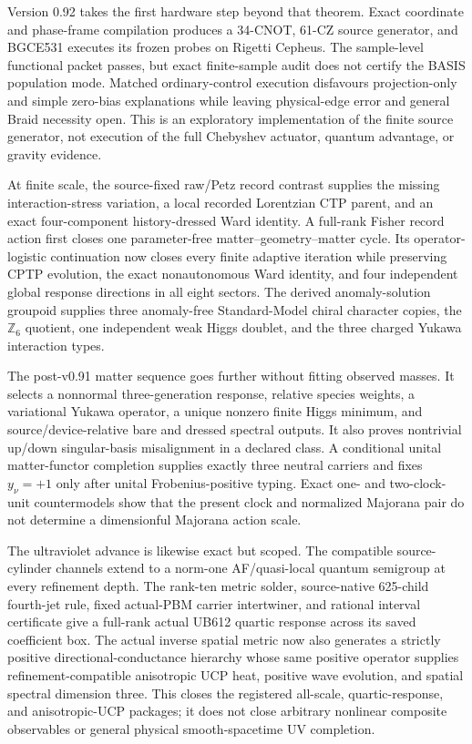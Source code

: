 \documentclass[11pt]{article}
\theoremstyle{definition}
\theoremstyle{remark}
\begin{document}
Version 0.92 takes the first hardware step beyond that theorem. Exact coordinate and phase-frame compilation produces a 34-CNOT, 61-CZ source generator, and BGCE531 executes its frozen probes on Rigetti Cepheus. The sample-level functional packet passes, but exact finite-sample audit does not certify the BASIS population mode. Matched ordinary-control execution disfavours projection-only and simple zero-bias explanations while leaving physical-edge error and general Braid necessity open. This is an exploratory implementation of the finite source generator, not execution of the full Chebyshev actuator, quantum advantage, or gravity evidence.

At finite scale, the source-fixed raw/Petz record contrast supplies the missing interaction-stress variation, a local recorded Lorentzian CTP parent, and an exact four-component history-dressed Ward identity. A full-rank Fisher record action first closes one parameter-free matter--geometry--matter cycle. Its operator-logistic continuation now closes every finite adaptive iteration while preserving CPTP evolution, the exact nonautonomous Ward identity, and four independent global response directions in all eight sectors. The derived anomaly-solution groupoid supplies three anomaly-free Standard-Model chiral character copies, the $\mathbb Z_6$ quotient, one independent weak Higgs doublet, and the three charged Yukawa interaction types.

The post-v0.91 matter sequence goes further without fitting observed masses. It selects a nonnormal three-generation response, relative species weights, a variational Yukawa operator, a unique nonzero finite Higgs minimum, and source/device-relative bare and dressed spectral outputs. It also proves nontrivial up/down singular-basis misalignment in a declared class. A conditional unital matter-functor completion supplies exactly three neutral carriers and fixes $y_\nu=+1$ only after unital Frobenius-positive typing. Exact one- and two-clock-unit countermodels show that the present clock and normalized Majorana pair do not determine a dimensionful Majorana action scale.

The ultraviolet advance is likewise exact but scoped. The compatible source-cylinder channels extend to a norm-one AF/quasi-local quantum semigroup at every refinement depth. The rank-ten metric solder, source-native 625-child fourth-jet rule, fixed actual-PBM carrier intertwiner, and rational interval certificate give a full-rank actual UB612 quartic response across its saved coefficient box. The actual inverse spatial metric now also generates a strictly positive directional-conductance hierarchy whose same positive operator supplies refinement-compatible anisotropic UCP heat, positive wave evolution, and spatial spectral dimension three. This closes the registered all-scale, quartic-response, and anisotropic-UCP packages; it does not close arbitrary nonlinear composite observables or general physical smooth-spacetime UV completion.
\end{document}
